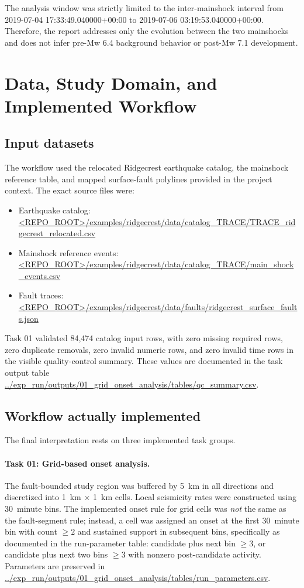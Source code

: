 \documentclass[11pt]{article}
\begin{document}
The analysis window was strictly limited to the inter-mainshock interval from 2019-07-04 17:33:49.040000+00:00 to 2019-07-06 03:19:53.040000+00:00. Therefore, the report addresses only the evolution between the two mainshocks and does not infer pre-Mw 6.4 background behavior or post-Mw 7.1 development.

\section{Data, Study Domain, and Implemented Workflow}
\subsection{Input datasets}
The workflow used the relocated Ridgecrest earthquake catalog, the mainshock reference table, and mapped surface-fault polylines provided in the project context. The exact source files were:
\begin{itemize}
    \item Earthquake catalog: \url{<REPO_ROOT>/examples/ridgecrest/data/catalog_TRACE/TRACE_ridgecrest_relocated.csv}
    \item Mainshock reference events: \url{<REPO_ROOT>/examples/ridgecrest/data/catalog_TRACE/main_shock_events.csv}
    \item Fault traces: \url{<REPO_ROOT>/examples/ridgecrest/data/faults/ridgecrest_surface_faults.json}
\end{itemize}

Task 01 validated 84,474 catalog input rows, with zero missing required rows, zero duplicate removals, zero invalid numeric rows, and zero invalid time rows in the visible quality-control summary. These values are documented in the task output table \url{../exp_run/outputs/01_grid_onset_analysis/tables/qc_summary.csv}.

\subsection{Workflow actually implemented}
The final interpretation rests on three implemented task groups.

\paragraph{Task 01: Grid-based onset analysis.}
The fault-bounded study region was buffered by \SI{5}{km} in all directions and discretized into \SI{1}{km} \(\times\) \SI{1}{km} cells. Local seismicity rates were constructed using \SI{30}{minute} bins. The implemented onset rule for grid cells was \emph{not} the same as the fault-segment rule; instead, a cell was assigned an onset at the first \SI{30}{minute} bin with count \(\ge 2\) and sustained support in subsequent bins, specifically as documented in the run-parameter table: candidate plus next bin \(\ge 3\), or candidate plus next two bins \(\ge 3\) with nonzero post-candidate activity. Parameters are preserved in \url{../exp_run/outputs/01_grid_onset_analysis/tables/run_parameters.csv}.
\end{document}
